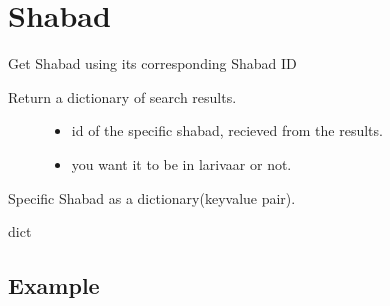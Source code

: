 \documentclass[letterpaper,10pt,english]{sphinxmanual}
\begin{document}
\chapter{Shabad}
\label{\detokenize{shabad:shabad}}\label{\detokenize{shabad::doc}}
\sphinxAtStartPar
Get Shabad using its corresponding Shabad ID

\begin{sphinxVerbatim}[commandchars=\\\{\}]
 
\end{sphinxVerbatim}

\sphinxAtStartPar
Return a dictionary of search results.
\begin{description}
\item[{}] \leavevmode\begin{itemize}
\item {} 
\sphinxAtStartPar
{}  \textendash{} id of the specific shabad, recieved from the  results.

\item {} 
\sphinxAtStartPar
{}  \sphinxhyphen{} you want it to be in larivaar or not.

\end{itemize}

\end{description}

\sphinxAtStartPar
{}    Specific Shabad as a dictionary(key\sphinxhyphen{}value pair).

\sphinxAtStartPar
{}    dict


\section{Example}
\label{\detokenize{shabad:example}}
\begin{sphinxVerbatim}[commandchars=\\\{\}]
  
\end{sphinxVerbatim}
\end{document}
